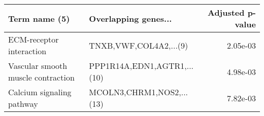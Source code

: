 \begin{tabular}{llr}
\toprule
                     Term name (5) &        Overlapping genes... &  Adjusted p-value \\
\midrule
          ECM-receptor interaction &      TNXB,VWF,COL4A2,...(9) &          2.05e-03 \\
Vascular smooth muscle contraction & PPP1R14A,EDN1,AGTR1,...(10) &          4.98e-03 \\
         Calcium signaling pathway &   MCOLN3,CHRM1,NOS2,...(13) &          7.82e-03 \\
\bottomrule
\end{tabular}

